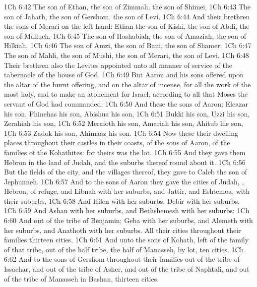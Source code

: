 \vs 1Ch 6:42 The son of Ethan, the son of Zimmah, the son of Shimei,
\vs 1Ch 6:43 The son of Jahath, the son of Gershom, the son of Levi.
\vs 1Ch 6:44 And their brethren the sons of Merari  on the left hand: Ethan the son of Kishi, the son of Abdi, the son of Malluch,
\vs 1Ch 6:45 The son of Hashabiah, the son of Amaziah, the son of Hilkiah,
\vs 1Ch 6:46 The son of Amzi, the son of Bani, the son of Shamer,
\vs 1Ch 6:47 The son of Mahli, the son of Mushi, the son of Merari, the son of Levi.
\vs 1Ch 6:48 Their brethren also the Levites  appointed unto all manner of service of the tabernacle of the house of God.
\vs 1Ch 6:49 But Aaron and his sons offered upon the altar of the burnt offering, and on the altar of incense,  for all the work of the  most holy, and to make an atonement for Israel, according to all that Moses the servant of God had commanded.
\vs 1Ch 6:50 And these  the sons of Aaron; Eleazar his son, Phinehas his son, Abishua his son,
\vs 1Ch 6:51 Bukki his son, Uzzi his son, Zerahiah his son,
\vs 1Ch 6:52 Meraioth his son, Amariah his son, Ahitub his son,
\vs 1Ch 6:53 Zadok his son, Ahimaaz his son.
\vs 1Ch 6:54 Now these  their dwelling places throughout their castles in their coasts, of the sons of Aaron, of the families of the Kohathites: for theirs was the lot.
\vs 1Ch 6:55 And they gave them Hebron in the land of Judah, and the suburbs thereof round about it.
\vs 1Ch 6:56 But the fields of the city, and the villages thereof, they gave to Caleb the son of Jephunneh.
\vs 1Ch 6:57 And to the sons of Aaron they gave the cities of Judah, , Hebron,  of refuge, and Libnah with her suburbs, and Jattir, and Eshtemoa, with their suburbs,
\vs 1Ch 6:58 And Hilen with her suburbs, Debir with her suburbs,
\vs 1Ch 6:59 And Ashan with her suburbs, and Bethshemesh with her suburbs:
\vs 1Ch 6:60 And out of the tribe of Benjamin; Geba with her suburbs, and Alemeth with her suburbs, and Anathoth with her suburbs. All their cities throughout their families  thirteen cities.
\vs 1Ch 6:61 And unto the sons of Kohath,  left of the family of that tribe,  out of the half tribe,  the half  of Manasseh, by lot, ten cities.
\vs 1Ch 6:62 And to the sons of Gershom throughout their families out of the tribe of Issachar, and out of the tribe of Asher, and out of the tribe of Naphtali, and out of the tribe of Manasseh in Bashan, thirteen cities.
